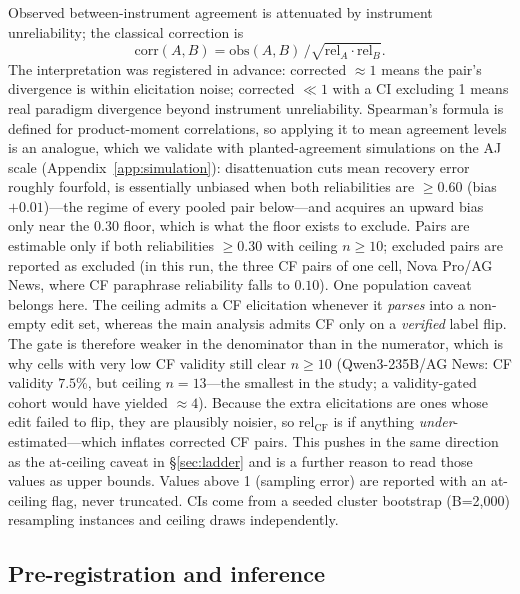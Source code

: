 \documentclass[11pt]{article}
\begin{document}
Observed between-instrument agreement is attenuated by instrument unreliability; the classical correction \citep{spearman1904proof} is
\begin{equation}
\mathrm{corr}(A,B) = \mathrm{obs}(A,B)\,/\sqrt{\mathrm{rel}_A\cdot \mathrm{rel}_B}.
\end{equation}
The interpretation was registered in advance: corrected $\approx 1$ means the pair's divergence is within elicitation noise; corrected $\ll 1$ with a CI excluding 1 means real paradigm divergence beyond instrument unreliability. Spearman's formula is defined for product-moment correlations, so applying it to mean agreement levels is an analogue, which we validate with planted-agreement simulations on the AJ scale (Appendix~\ref{app:simulation}): disattenuation cuts mean recovery error roughly fourfold, is essentially unbiased when both reliabilities are $\ge 0.60$ (bias $+0.01$)---the regime of every pooled pair below---and acquires an upward bias only near the $0.30$ floor, which is what the floor exists to exclude. Pairs are estimable only if both reliabilities $\ge 0.30$ with ceiling $n\ge10$; excluded pairs are reported as excluded (in this run, the three CF pairs of one cell, Nova Pro/AG News, where CF paraphrase reliability falls to $0.10$). One population caveat belongs here. The ceiling admits a CF elicitation whenever it \emph{parses} into a non-empty edit set, whereas the main analysis admits CF only on a \emph{verified} label flip. The gate is therefore weaker in the denominator than in the numerator, which is why cells with very low CF validity still clear $n\ge10$ (Qwen3-235B/AG News: CF validity $7.5\%$, but ceiling $n=13$---the smallest in the study; a validity-gated cohort would have yielded ${\approx}4$). Because the extra elicitations are ones whose edit failed to flip, they are plausibly noisier, so $\mathrm{rel}_{\mathrm{CF}}$ is if anything \emph{under}-estimated---which inflates corrected CF pairs. This pushes in the same direction as the at-ceiling caveat in \S\ref{sec:ladder} and is a further reason to read those values as upper bounds. Values above 1 (sampling error) are reported with an at-ceiling flag, never truncated. CIs come from a seeded cluster bootstrap (B=2{,}000) resampling instances and ceiling draws independently.

\subsection{Pre-registration and inference}
\label{sec:prereg}
\end{document}
